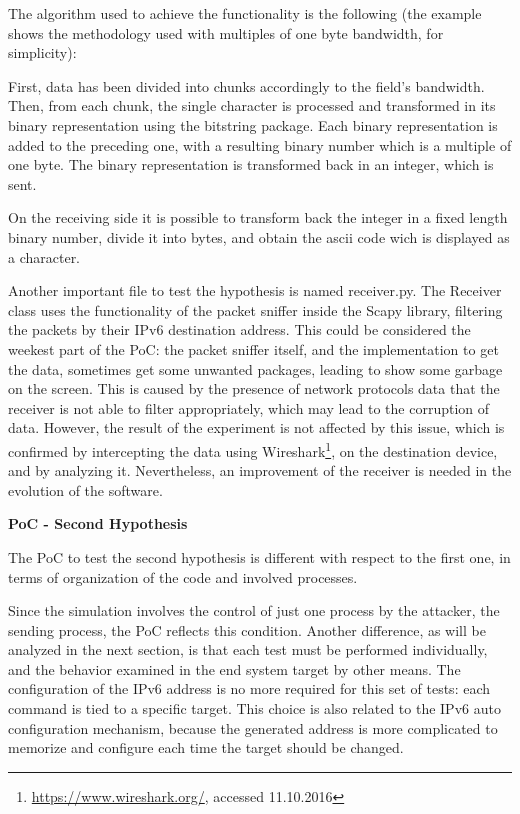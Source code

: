 \documentclass[12pt]{article}
\begin{document}
The algorithm used to achieve the functionality is the following (the example shows the methodology used with multiples of one byte bandwidth, for simplicity):

First, data has been divided into chunks accordingly to the field's bandwidth. Then, from each chunk, the single character is processed and transformed in its binary representation using the bitstring package. Each binary representation is added to the preceding one, with a resulting binary number which is a multiple of one byte. The binary representation is transformed back in an integer, which is sent.

On the receiving side it is possible to transform back the integer in a fixed length binary number, divide it into bytes, and obtain the ascii code wich is displayed as a character.

Another important file to test the hypothesis is named receiver.py. The Receiver class uses the functionality of the packet sniffer inside the Scapy library, filtering the packets by their IPv6 destination address. This could be considered the weekest part of the PoC: the packet sniffer itself, and the implementation to get the data, sometimes get some unwanted packages, leading to show some garbage on the screen. This is caused by the presence of network protocols data that the receiver is not able to filter appropriately, which may lead to the corruption of data. However, the result of the experiment is not affected by this issue, which is confirmed by intercepting the data using Wireshark\footnote{\url{https://www.wireshark.org/}, accessed 11.10.2016}, on the destination device, and by analyzing it. Nevertheless, an improvement of the receiver is needed in the evolution of the software.

\textbf{PoC - Second Hypothesis}

The PoC to test the second hypothesis is different with respect to the first one, in terms of organization of the code and involved processes. 

Since the simulation involves the control of just one process by the attacker, the sending process, the PoC reflects this condition. Another difference, as will be analyzed in the next section, is that each test must be performed individually, and the behavior examined in the end system target by other means. The configuration of the IPv6 address is no more required for this set of tests: each command is tied to a specific target. This choice is also related to the IPv6 auto configuration mechanism, because the generated address is more complicated to memorize and configure each time the target should be changed.
\end{document}
